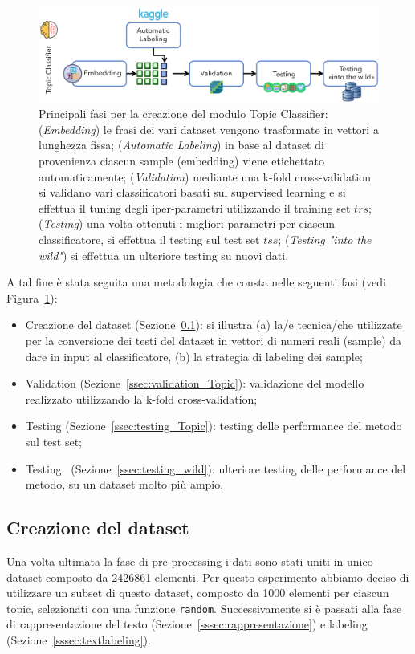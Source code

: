 \begin{figure}[h!t]
    \centering
    \includegraphics[width=15cm]{Figure/grafici/topicmethod_cropped.pdf}
    \caption{Principali fasi per la creazione del modulo Topic Classifier: (\textit{Embedding}) le frasi dei vari dataset vengono trasformate in vettori a lunghezza fissa; (\textit{Automatic Labeling}) in base al dataset di provenienza ciascun sample (embedding) viene etichettato automaticamente; (\textit{Validation}) mediante una k-fold cross-validation si validano vari classificatori basati sul supervised learning e si effettua il tuning degli iper-parametri utilizzando il training set $trs$; (\textit{Testing}) una volta ottenuti i migliori parametri per ciascun classificatore, si effettua il testing sul test set $tss$; (\textit{Testing "into the wild"}) si effettua un ulteriore testing su nuovi dati.}
    \label{fig:topicmethod}
\end{figure}

A tal fine è stata seguita una metodologia che consta nelle seguenti fasi (vedi Figura~\ref{fig:topicmethod}):
\begin{itemize}
    \item Creazione del dataset (Sezione~\ref{ssec:createds}): si illustra (a) la/e tecnica/che utilizzate per la conversione dei testi del dataset in vettori di numeri reali (sample) da dare in input al classificatore, (b) la strategia di labeling dei sample; 
    \item Validation (Sezione~\ref{ssec:validation_Topic}): validazione del modello realizzato utilizzando la k-fold cross-validation;
    \item Testing (Sezione~\ref{ssec:testing_Topic}): testing delle performance del metodo sul test set;
    \item Testing~ (Sezione~\ref{ssec:testing_wild}): ulteriore testing delle performance del metodo, su un dataset molto più ampio.
\end{itemize}

\subsection{Creazione del dataset}
\label{ssec:createds}
Una volta ultimata la fase di pre-processing i dati sono stati uniti in unico dataset composto da 2426861 elementi. Per questo esperimento abbiamo deciso di utilizzare un subset di questo dataset, composto da 1000 elementi per ciascun topic, selezionati con una funzione {\tt random}. Successivamente si è passati alla fase di rappresentazione del testo (Sezione~\ref{sssec:rappresentazione}) e labeling (Sezione~\ref{sssec:textlabeling}).

